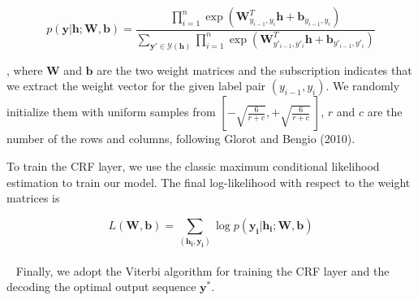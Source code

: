 {\scriptsize $$ p(\mathbf{y}|\mathbf{h}; \mathbf{W},\mathbf{b}) 
= \frac{\prod_{i=1}^n \exp(\mathbf{W}^T_{y_{i-1},y_{i}}\mathbf{h} + \mathbf{b}_{y_{i-1},y_{i}})}
{ \sum_{\mathbf{y'} \in \mathcal{Y}(\mathbf{h})} \prod_{i=1}^n \exp(\mathbf{W}^T_{y'_{i-1},y'_{i}}\mathbf{h} + \mathbf{b}_{y'_{i-1},y'_{i}})} 
$$
}

, where $\mathbf W$ and $\mathbf b$ are the two weight matrices and the subscription indicates that we extract the weight vector for the given label pair $(y_{i-1},y_i)$. 
We randomly initialize them with uniform samples from 
$\left[-\sqrt{\frac{6}{r+c}}, +\sqrt{\frac{6}{r+c}}~\right]$, 
$r$ and $c$ are the number of the rows and columns, following Glorot and Bengio (2010).

To train the CRF layer, we use the classic maximum conditional likelihood estimation to train our model. 
The final log-likelihood with respect to the weight matrices is 

$$ L(\mathbf{W},\mathbf{b}) = \sum_{(\mathbf{h_i}, \mathbf{y_i})}  \log p(\mathbf{y_i}|\mathbf{h_i}; \mathbf{W},\mathbf{b}) $$
~\\~
Finally, we adopt the Viterbi algorithm for training the CRF layer and the decoding the optimal output sequence $\mathbf{y^*}$.



